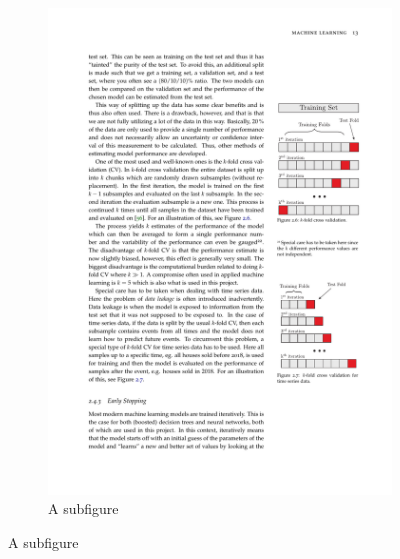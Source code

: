\begin{figure}
\begin{subfigure}{.5\textwidth}
        \includegraphics[trim={14.14cm 7.67cm 2.1cm 16.5cm}, clip, width=.8\linewidth]{figures/MasterThesis-cross-validation}
        \caption{A subfigure}
        \label{fig:sub2}
    \end{subfigure}
\end{figure}





